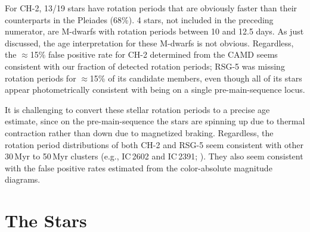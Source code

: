\documentclass[12pt,twocolumn]{aastex63}
\begin{document}
%
%
%

For CH-2, 13/19 stars have rotation periods that are obviously faster
than their counterparts in the Pleiades (68\%).  4 stars, not included
in the preceding numerator, are M-dwarfs with rotation periods between
10 and 12.5 days.  As just discussed, the age interpretation for these
M-dwarfs is not obvious.  Regardless, the $\approx$15\% false positive
rate for CH-2 determined from the CAMD seems consistent with our
fraction of detected rotation periods; RSG-5 was missing
rotation periods for $\approx$15\% of its candidate members, even
though all of its stars appear photometrically consistent with being
on a single pre-main-sequence locus.

It is challenging to convert these stellar rotation periods to a
precise age estimate, since on the pre-main-sequence the stars are
spinning up due to thermal contraction rather than down due to
magnetized braking.  Regardless, the rotation period distributions of
both CH-2 and RSG-5 seem consistent with other 30\,Myr to 50\,Myr
clusters ({e.g.}, IC\,2602 and IC\,2391;
\citealt{douglas_stephanie_t_2021_5131306}).  They also seem
consistent with the false positive rates estimated from the
color-absolute magnitude diagrams.


\section{The Stars}
\label{sec:stars}
\end{document}
